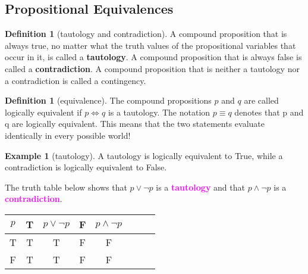 \documentclass[letterpaper,10pt]{article}
\theoremstyle{plain}
\theoremstyle{definition}
\newtheorem{defn}[thm]{Definition}
\newtheorem{exmp}[thm]{Example}
\theoremstyle{remark}
\providecommand{\land}{\ensuremath{\wedge}}
\providecommand{\lor}{\ensuremath{\vee}}
\providecommand{\todo}[1]{\textcolor{magenta}{\textbf{#1}}}
\begin{document}
\newpage

\subsection{Propositional Equivalences}

\begin{defn}[tautology and contradiction]

A compound proposition that is always true, no matter what the truth values of the propositional
variables that occur in it, is called a \textbf{tautology}. A compound proposition that is always
false is called a \textbf{contradiction}. A compound proposition that is neither a tautology nor a
contradiction is called a contingency.

\end{defn}
\begin{defn}[equivalence]
The compound propositions $p$ and $q$ are called logically equivalent if $p \iff q$ is a tautology.
The notation $p \equiv q$ denotes that p and q are logically equivalent. This means that the two statements evaluate identically in every possible world!
\end{defn}
\begin{exmp}[tautology]
A tautology is logically equivalent to True, while a contradiction is logically equivalent to False.

The truth table below shows that $p \lor \lnot p$ is a \todo{tautology} and that $p \land \lnot p$ is a \todo{contradiction}.
\begin{center} 
\begin{tabular}{ | c | c | c |c |c |c |c |c |} 
  \hline
 $p$ & T & $ p \lor \lnot p$&F & $p \land \lnot p$\\
 \hline
  T &T  &T&F&F\\ 
  F & T & T&F&F\\ 
  \hline
\end{tabular}
\end{center}
\end{exmp}
\end{document}

